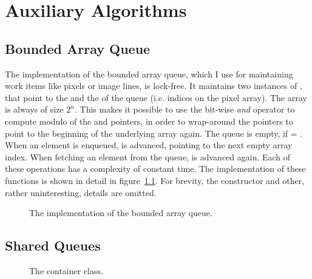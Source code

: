 \chapter{Auxiliary Algorithms}
\label{chpt:auxiliary-algorithms}

\section{Bounded Array Queue}
\label{sec:bounded-array-queue}

The implementation of the bounded array queue, which I use for maintaining work
items like pixels or image lines, is lock-free. It maintains two instances of
, that point to the  and the
 of the queue (i.e. indices on the pixel array). The array is
always of size $2^n$. This makes it possible to use the bit-wise \emph{and}
operator to compute modulo of the  and 
pointers, in order to wrap-around the pointers to point to the beginning of the
underlying array again. The queue is empty, if  =
. When an element is enqueued,  is advanced,
pointing to the next empty array index. When fetching an element from the queue,
 is advanced again. Each of these operations has a complexity
of constant time. The implementation of these functions is shown in detail in
figure~\ref{fig:bounded-array-queue}. For brevity, the constructor and other,
rather uninteresting, details are omitted.

\begin{figure}
  \centering
  
  \caption{The implementation of the bounded array queue.}
  \label{fig:bounded-array-queue}
\end{figure}

\section{Shared Queues}
\label{sec:area-opening-queues} %

\begin{figure}
  \centering

  

  \caption{The  container class.}
  \label{fig:ao-wf-queues}
\end{figure}

